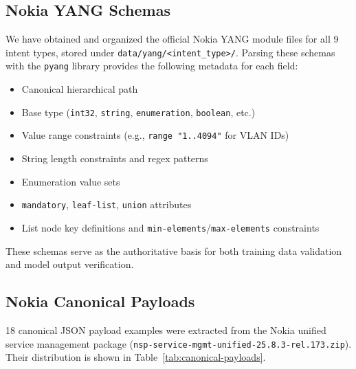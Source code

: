 \documentclass[12pt, a4paper]{article}
\newcommand{\filepath}[1]{\texttt{#1}}
\newcommand{\yang}{\textsc{YANG}}
\begin{document}
\subsection{Nokia YANG Schemas}

We have obtained and organized the official Nokia \yang{} module files for all 9 intent types, stored under \filepath{data/yang/<intent\_type>/}. Parsing these schemas with the \texttt{pyang} library provides the following metadata for each field:

\begin{itemize}
  \item Canonical hierarchical path
  \item Base type (\texttt{int32}, \texttt{string}, \texttt{enumeration}, \texttt{boolean}, etc.)
  \item Value range constraints (e.g., \texttt{range "1..4094"} for VLAN IDs)
  \item String length constraints and regex patterns
  \item Enumeration value sets
  \item \texttt{mandatory}, \texttt{leaf-list}, \texttt{union} attributes
  \item List node key definitions and \texttt{min-elements}/\texttt{max-elements} constraints
\end{itemize}

\noindent
These schemas serve as the authoritative basis for both training data validation and model output verification.

\subsection{Nokia Canonical Payloads}

18 canonical JSON payload examples were extracted from the Nokia unified service management package (\texttt{nsp-service-mgmt-unified-25.8.3-rel.173.zip}). Their distribution is shown in Table~\ref{tab:canonical-payloads}.
\end{document}
